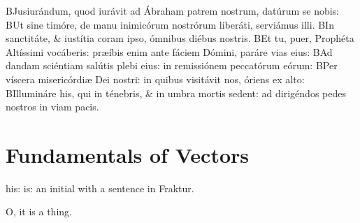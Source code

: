 \documentclass[a5paper,10pt]{book}
\begin{document}
\begin{multicols*}{2}
\newline \color{red} B\color{black}Jusiurándum, quod iurávit ad Ábraham patrem nostrum, datúrum se nobis:
\newline \color{red} B\color{black}Ut sine timóre, de manu inimicórum nostrórum liberáti, serviámus illi.
\newline \color{red} B\color{black}In sanctitáte, \& iustítia coram ipso, ómnibus diébus nostris.
\newline \color{red} B\color{black}Et tu, puer, Prophéta Altíssimi vocáberis: præíbis enim ante fáciem Dómini, paráre vias eius:
\newline \color{red} B\color{black}Ad dandam sciéntiam salútis plebi eius: in remissiónem peccatórum eórum:
\newline \color{red} B\color{black}Per víscera misericórdiæ Dei nostri: in quibus visitávit nos, óriens ex alto:
\newline \color{red} B\color{black}Illumináre his, qui in ténebris, \& in umbra mortis sedent: ad dirigéndos pedes nostros in viam pacis.




\end{multicols*}



\newpage
\thispagestyle{empty}
\mbox{}
\newpage

\chapter{Fundamentals of Vectors}


\begin{center}
{\frakfamily\fraklines
   his: is: an initial with a sentence in Fraktur. \etc \\
}
\end{center}

 O, it is a thing.
\Huge
{}\\
\\

\\
\\
\end{document}
